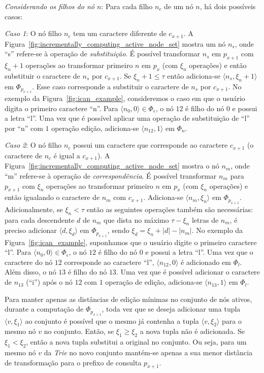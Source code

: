 \textit{Considerando os filhos do nó $n$}: Para cada filho $n_{c}$ de um nó $n$, há dois possíveis casos:

\textit{Caso 1}: O nó filho $n_{c}$ tem um caractere diferente de $c_{x+1}$. A Figura~\ref{fig:incrementally_computing_active_node_set} mostra um nó $n_{s}$, onde ``s'' refere-se à operação de \textit{substituição}. É possível transformar $n_{s}$ em $p_{x+1}$ com $\xi_{n} + 1$ operações ao transformar primeiro $n$ em $p_{x}$ (com $\xi_{n}$ operações) e então substituir o caractere de $n_{s}$ por $c_{x+1}$. Se $\xi_{n} + 1 \leq \tau$ então adiciona-se $\langle n_{s}, \xi_{n} + 1 \rangle$ em $\Phi_{p_{x+1}}$. Esse caso corresponde a substituir o caractere de $n_{s}$ por $c_{x+1}$. No exemplo da Figura~\ref{fig:ican_example}, consideremos o caso em que o usuário digita o primeiro caractere ``n''. Para $\langle n_{0}, 0 \rangle \in \Phi_{\epsilon}$, o nó $12$ é filho do nó $0$ e possui a letra ``l''. Uma vez que é possível aplicar uma operação de substituição de ``l'' por ``n'' com $1$ operação  edição, adiciona-se $\langle n_{12}, 1 \rangle$ em $\Phi_{n}$. 

\textit{Caso 2}: O nó filho $n_{c}$ possui um caractere que corresponde ao caractere $c_{x+1}$ (o caractere de $n_{c}$ é igual a $c_{x+1}$). A Figura~\ref{fig:incrementally_computing_active_node_set} mostra o nó $n_{m}$, onde ``m'' refere-se à operação de \textit{correspondência}. É possível transformar $n_{m}$ para $p_{x+1}$ com $\xi_{n}$ operações ao transformar primeiro $n$ em $p_{x}$ (com $\xi_{n}$ operações) e então igualando o caractere de $n_{m}$ com $c_{x+1}$. Adiciona-se $\langle n_{m}, \xi_{n} \rangle$ em $\Phi_{p_{x+1}}$. Adicionalmente, se $\xi_{n} < \tau$ então as seguintes operações também são necessárias: para cada descendente $d$ de $n_{m}$ que dista no máximo $\tau - \xi_{n}$ letras de $n_{m}$, é preciso adicionar $\langle d, \xi_{d} \rangle$ em $\Phi_{p_{x+1}}$, sendo $\xi_{d} = \xi_{n} + |d| - |n_{m}|$. No exemplo da Figura~\ref{fig:ican_example}, suponhamos que o usuário digite o primeiro caractere ``l''. Para $\langle n_{0}, 0 \rangle \in \Phi_{\epsilon}$, o nó $12$ é filho do nó $0$ e possui a letra ``l''. Uma vez que o caractere do nó $12$ corresponde ao caractere ``l'', $\langle n_{12}, 0 \rangle$ é adicionado em $\Phi_{l}$. Além disso, o nó $13$ é filho do nó $13$. Uma vez que é possível adicionar o caractere de $n_{13}$ (``i'') após o nó $12$ com $1$ operação de edição, adiciona-se $\langle n_{13}, 1 \rangle$ em $\Phi_{l}$.

Para manter apenas as distâncias de edição mínimas no conjunto de nós ativos, durante a computação de $\Phi_{p_{x+1}}$, toda vez que se deseja adicionar uma tupla $\langle v, \xi_{1} \rangle$ ao conjunto é possível que o mesmo já contenha a tupla $\langle v, \xi_{2} \rangle$ para o mesmo nó $v$ no conjunto. Então, se $\xi_{1} \geq \xi_{2}$ a nova tupla não é adicionada. Se $\xi_{1} < \xi_{2}$, então a nova tupla substitui a original no conjunto. Ou seja, para um mesmo nó $v$ da \textit{Trie} no novo conjunto mantém-se apenas a sua menor distância de transformação para o prefixo de consulta $p_{x+1}$.

